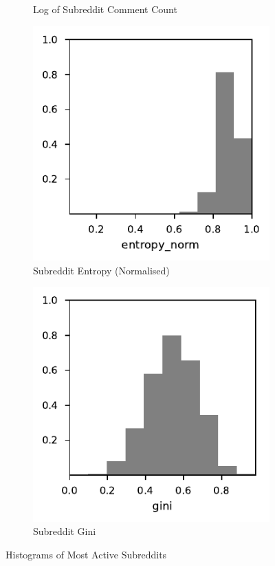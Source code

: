 \documentclass{article}
\begin{document}
\begin{figure}
\begin{subfigure}[b]{0.49\textwidth}
         \caption{Log of Subreddit Comment Count}
         \label{hist:comment}
     \end{subfigure}
     \hfill
     \begin{subfigure}[b]{0.49\textwidth}
         \centering
         \includegraphics[width=\textwidth]{hist-entropy_norm.pdf}
         \caption{Subreddit Entropy (Normalised)}
         \label{hist:entropy}
     \end{subfigure}
     \hfill
     \begin{subfigure}[b]{0.49\textwidth}
         \centering
         \includegraphics[width=\textwidth]{hist-gini.pdf}
         \caption{Subreddit Gini}
         \label{hist:gini}
     \end{subfigure}
        \caption{Histograms of Most Active Subreddits}
        \label{hists}
\end{figure}
\end{document}
